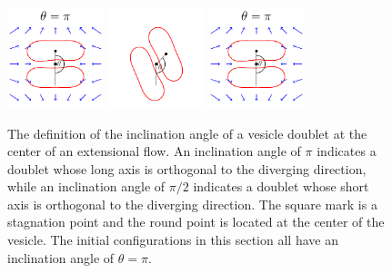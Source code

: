 \documentclass[prf,superscriptaddress,showkeys]{revtex4-1}
\begin{document}
\begin{figure}[htp]
   \includegraphics[width=0.25\textwidth]{figs/rotate1.pdf}
   \hspace{20pt}
   \includegraphics[width=0.25\textwidth]{figs/angleDefinition.pdf}
   \hspace{20pt}
   \includegraphics[width=0.25\textwidth]{figs/rotate2.pdf}
   \caption{\label{fig:InclinationAngle} The definition of the
   inclination angle of a vesicle doublet at the center of an
   extensional flow.  An inclination angle of $\pi$ indicates a doublet
   whose long axis is orthogonal to the diverging direction, while an
   inclination angle of $\pi/2$ indicates a doublet whose short axis is
   orthogonal to the diverging direction.  The square mark is a
   stagnation point and the round point is located at the center of the
   vesicle.  The initial configurations in this section all have an
   inclination angle of $\theta = \pi$.}
 \end{figure}
\end{document}
